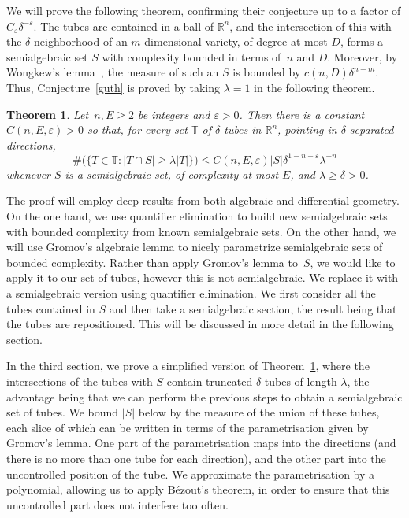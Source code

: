 \documentclass[letterpaper, reqno, 11pt]{amsart}
\newtheorem{thm}{Theorem}[section]
\theoremstyle{remark}
\numberwithin{equation}{section}
\begin{document}
We will prove the following theorem, confirming their conjecture up to a factor of $C_\varepsilon\delta^{-\varepsilon}$. The tubes are contained in a ball of $\mathbb{R}^n$, and the intersection of this with the $\delta$-neighborhood of an $m$-dimensional variety, of degree at most $D$, forms a semialgebraic set $S$ with complexity bounded in terms of~$n$ and $D$. Moreover, by Wongkew's lemma~\cite{Wo}, the measure of such an $S$ is bounded by $c(n,D)\delta^{n-m}$. Thus, Conjecture~\ref{guth} is proved  by taking $\lambda=1$ in the following theorem.

\begin{thm}\label{mainThm}
Let~$n,E\ge 2$ be integers and $\varepsilon>0$. Then there is a constant $C(n,E,\varepsilon)>0$ so that, for every set $\mathbb{T}$ of $\delta$-tubes in $\mathbb{R}^n$, pointing in  $\delta$-separated directions, 
\begin{equation}\label{kakeq}\#\big(\big\{ T \in \mathbb{T} :  |T \cap S| \geq \lambda |T| \big\}\big) \leq C(n,E,\varepsilon) |S| \delta^{1-n-\varepsilon} \lambda^{-n}\end{equation}
whenever $S$ is a semialgebraic set, of complexity at most $E$, and $\lambda\ge \delta>0$.
\end{thm}



The proof 
will employ deep results from both algebraic and differential geometry. On the one hand, we use quantifier elimination to build new semialgebraic sets with bounded complexity from known semialgebraic sets.  On the other hand, we will use Gromov's algebraic lemma to nicely parametrize semialgebraic sets of bounded complexity. 
Rather than apply Gromov's lemma to~$S$, we would like to apply it to our set of tubes, however this is not semialgebraic. We replace it with a semialgebraic version using quantifier elimination. We first consider all the tubes contained in $S$ and then take a semialgebraic section, the result being that the tubes are repositioned. This will be discussed in more detail in the following section.
 
 In the third section, we prove a simplified version of  Theorem~\ref{mainThm}, where the intersections of the tubes with $S$ contain truncated $\delta$-tubes of length $\lambda$, the advantage being that we can perform the previous steps to obtain a semialgebraic set of tubes. We bound $|S|$ below by the measure of the union of these tubes, each slice of which can be written in terms of the parametrisation given by Gromov's lemma. One part of the parametrisation maps into the directions (and there is no more than one tube for each direction), and the other part into the uncontrolled position of the tube. We approximate the parametrisation by a polynomial, allowing us to apply B\'ezout's theorem, in order to ensure that this uncontrolled part does not interfere too often.
 
\end{document}
